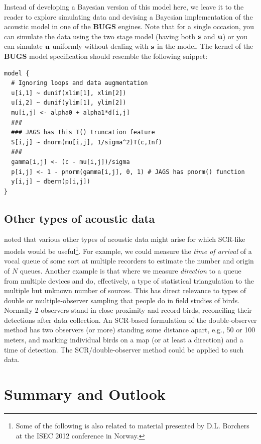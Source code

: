 Instead of developing a Bayesian version of this model here,
we leave it to the reader to
explore simulating data and devising a Bayesian implementation of the
acoustic model in one of the {\bf BUGS} engines.
Note that for a
single occasion, you can simulate the data using the two stage model
(having both ${\bf s}$ and ${\bf u}$) or you can simulate ${\bf u}$
uniformly without dealing with ${\bf s}$ in the model.
The kernel of the {\bf BUGS} model specification 
should resemble the following snippet:
{\small
\begin{verbatim}
model {
  # Ignoring loops and data augmentation
  u[i,1] ~ dunif(xlim[1], xlim[2])
  u[i,2] ~ dunif(ylim[1], ylim[2])
  mu[i,j] <- alpha0 + alpha1*d[i,j]
  ###
  ### JAGS has this T() truncation feature
  S[i,j] ~ dnorm(mu[i,j], 1/sigma^2)T(c,Inf) 
  ###
  gamma[i,j] <- (c - mu[i,j])/sigma
  p[i,j] <- 1 - pnorm(gamma[i,j], 0, 1) # JAGS has pnorm() function
  y[i,j] ~ dbern(p[i,j])
}
\end{verbatim}
}



\subsection{Other types of acoustic data}

\citet{efford_dawson:2010} noted that various other types of acoustic
data might arise for which SCR-like models would be
useful\footnote{Some of the following is also related to material
  presented by D.L. Borchers at the ISEC 2012 conference in Norway.}.
For example, we could measure the {\it time of
  arrival} of a vocal queue of some sort at multiple recorders to
estimate the number and origin of $N$ queues.
Another example is that where we measure {\it direction} to a queue
from multiple devices and do, effectively, a type of statistical
triangulation to the multiple but unknown number of sources.  This has
direct relevance to types of double or multiple-observer sampling that
people do in field studies of birds. Normally 2 observers stand in
close proximity and record birds, reconciling their detections after
data collection. An SCR-based formulation of the double-observer
method has two observers (or more) standing some distance apart, e.g.,
50 or 100 meters,  and marking individual birds on a map (or at
least a direction) and a time of detection.  The SCR/double-observer
method could be applied to such data.



\section{Summary and Outlook}

